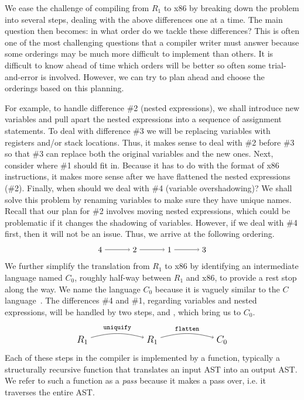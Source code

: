 \documentclass[11pt]{book}
\begin{document}
We ease the challenge of compiling from $R_1$ to x86 by breaking down
the problem into several steps, dealing with the above differences one
at a time. The main question then becomes: in what order do we tackle
these differences? This is often one of the most challenging questions
that a compiler writer must answer because some orderings may be much
more difficult to implement than others. It is difficult to know ahead
of time which orders will be better so often some trial-and-error is
involved. However, we can try to plan ahead and choose the orderings
based on this planning.

For example, to handle difference \#2 (nested expressions), we shall
introduce new variables and pull apart the nested expressions into a
sequence of assignment statements.  To deal with difference \#3 we
will be replacing variables with registers and/or stack
locations. Thus, it makes sense to deal with \#2 before \#3 so that
\#3 can replace both the original variables and the new ones. Next,
consider where \#1 should fit in. Because it has to do with the format
of x86 instructions, it makes more sense after we have flattened the
nested expressions (\#2). Finally, when should we deal with \#4
(variable overshadowing)?  We shall solve this problem by renaming
variables to make sure they have unique names. Recall that our plan
for \#2 involves moving nested expressions, which could be problematic
if it changes the shadowing of variables. However, if we deal with \#4
first, then it will not be an issue.  Thus, we arrive at the following
ordering.
\[
\begin{tikzpicture}[baseline=(current  bounding  box.center)]
\foreach \i/\p in {4/1,2/2,1/3,3/4}
{ 
  \node (\i) at (\p*1.5,0) {$\i$};
}
\foreach \x/\y in {4/2,2/1,1/3}
{
  \draw[->] (\x) to (\y);
}
\end{tikzpicture}
\]
We further simplify the translation from $R_1$ to x86 by identifying
an intermediate language named $C_0$, roughly half-way between $R_1$
and x86, to provide a rest stop along the way. We name the language
$C_0$ because it is vaguely similar to the $C$
language~\citep{Kernighan:1988nx}. The differences \#4 and \#1,
regarding variables and nested expressions, will be handled by two
steps,  and , which bring us to
$C_0$.
\[
\begin{tikzpicture}[baseline=(current  bounding  box.center)]
\foreach \i/\p in {R_1/1,R_1/2,C_0/3}
{ 
  \node (\p) at (\p*3,0) {\large $\i$};
}
\foreach \x/\y/\lbl in {1/2/uniquify,2/3/flatten}
{
 \path[->,bend left=15] (\x) edge [above] node {\ttfamily\footnotesize \lbl} (\y);
}
\end{tikzpicture}
\]
Each of these steps in the compiler is implemented by a function,
typically a structurally recursive function that translates an input
AST into an output AST. We refer to such a function as a \emph{pass}
because it makes a pass over, i.e. it traverses the entire AST.
\end{document}
